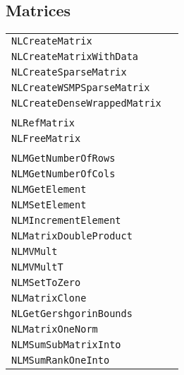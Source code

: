 \documentclass[12pt]{article}
\begin{document}
\subsection{Matrices}

\begin{center}
\begin{tabular}{ll}

\tt NLCreateMatrix&\pageref{Subroutine:NLCreateMatrix}\\
\tt NLCreateMatrixWithData&\pageref{Subroutine:NLCreateMatrixWithData}\\
\tt NLCreateSparseMatrix&\pageref{Subroutine:NLCreateSparseMatrix}\\
\tt NLCreateWSMPSparseMatrix&\pageref{Subroutine:NLCreateWSMPSparseMatrix}\\
\tt NLCreateDenseWrappedMatrix&\pageref{Subroutine:NLCreateDenseWrappedMatrix}\\
\\
\tt NLRefMatrix&\pageref{Subroutine:NLRefMatrix}\\
\tt NLFreeMatrix&\pageref{Subroutine:NLFreeMatrix}\\
\\
\tt NLMGetNumberOfRows&\pageref{Subroutine:NLMGetNumberOfRows}\\
\tt NLMGetNumberOfCols&\pageref{Subroutine:NLMGetNumberOfCols}\\
\tt NLMGetElement&\pageref{Subroutine:NLMGetElement}\\
\tt NLMSetElement&\pageref{Subroutine:NLMSetElement}\\
\tt NLMIncrementElement&\pageref{Subroutine:NLMIncrementElement}\\
\tt NLMatrixDoubleProduct&\pageref{Subroutine:NLMatrixDoubleProduct}\\
\tt NLMVMult&\pageref{Subroutine:NLMVMult}\\
\tt NLMVMultT&\pageref{Subroutine:NLMVMultT}\\
\tt NLMSetToZero&\pageref{Subroutine:NLMSetToZero}\\
\tt NLMatrixClone&\pageref{Subroutine:NLMatrixClone}\\
\tt NLGetGershgorinBounds&\pageref{Subroutine:NLGetGershgorinBounds}\\
\tt NLMatrixOneNorm&\pageref{Subroutine:NLMatrixOneNorm}\\
\tt NLMSumSubMatrixInto&\pageref{Subroutine:NLMSumSubMatrixInto}\\
\tt NLMSumRankOneInto&\pageref{Subroutine:NLMSumRankOneInto}\\

\end{tabular}
\end{center}
\end{document}
